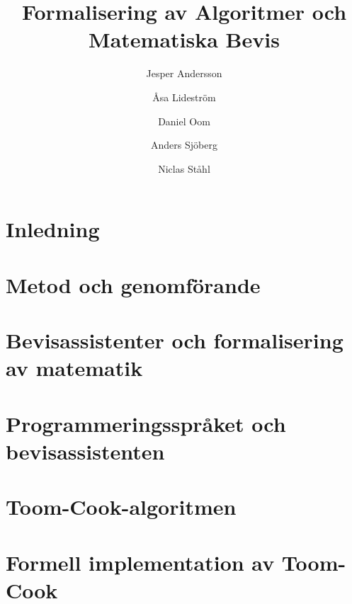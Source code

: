 \documentclass[a4paper]{report}
\title{Formalisering av Algoritmer och Matematiska Bevis}
\author{Jesper Andersson\and Åsa Lideström\and Daniel Oom\and Anders Sjöberg\and Niclas Ståhl}
\begin{document}


\begin{abstract}

\end{abstract}
\begin{abstract}

\end{abstract}
\renewcommand{\abstractname}{Tacksägelser}
\begin{abstract}

\end{abstract}

\tableofcontents

\chapter{Inledning}
\label{sec:inledning}


\newpage
\chapter{Metod och genomförande}
\label{sec:metod}


\newpage
\chapter{Bevisassistenter och formalisering av matematik}
\label{sec:formalisering}


\newpage
\chapter{Programmeringsspråket och bevisassistenten \coq}
\label{sec:coq}







\newpage
\chapter{Toom-Cook-algoritmen}
\label{sec:toomcook}






\newpage
\chapter{Formell implementation av Toom-Cook}
\label{sec:formell}


\end{document}
